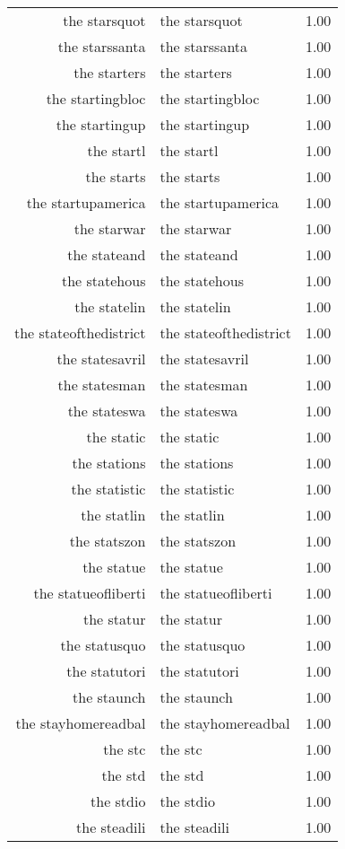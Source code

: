 \begin{table}[ht]
\begin{tabular}{rlr}
  the starsquot & the starsquot & 1.00 \\ 
  the starssanta & the starssanta & 1.00 \\ 
  the starters & the starters & 1.00 \\ 
  the startingbloc & the startingbloc & 1.00 \\ 
  the startingup & the startingup & 1.00 \\ 
  the startl & the startl & 1.00 \\ 
  the starts & the starts & 1.00 \\ 
  the startupamerica & the startupamerica & 1.00 \\ 
  the starwar & the starwar & 1.00 \\ 
  the stateand & the stateand & 1.00 \\ 
  the statehous & the statehous & 1.00 \\ 
  the statelin & the statelin & 1.00 \\ 
  the stateofthedistrict & the stateofthedistrict & 1.00 \\ 
  the statesavril & the statesavril & 1.00 \\ 
  the statesman & the statesman & 1.00 \\ 
  the stateswa & the stateswa & 1.00 \\ 
  the static & the static & 1.00 \\ 
  the stations & the stations & 1.00 \\ 
  the statistic & the statistic & 1.00 \\ 
  the statlin & the statlin & 1.00 \\ 
  the statszon & the statszon & 1.00 \\ 
  the statue & the statue & 1.00 \\ 
  the statueofliberti & the statueofliberti & 1.00 \\ 
  the statur & the statur & 1.00 \\ 
  the statusquo & the statusquo & 1.00 \\ 
  the statutori & the statutori & 1.00 \\ 
  the staunch & the staunch & 1.00 \\ 
  the stayhomereadbal & the stayhomereadbal & 1.00 \\ 
  the stc & the stc & 1.00 \\ 
  the std & the std & 1.00 \\ 
  the stdio & the stdio & 1.00 \\ 
  the steadili & the steadili & 1.00 \\ 

\end{tabular}
\end{table}
